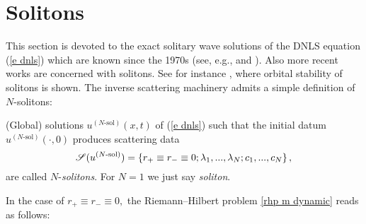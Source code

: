 \section{Solitons}\label{s solitons}
This section is devoted to the exact solitary wave solutions of the DNLS equation (\ref{e dnls}) which are known since the 1970s (see, e.g., \cite{mjlhus1976} and \cite{KaupNewell1978}). Also more recent works are concerned with solitons. See for instance \cite{Colin2006}, where orbital stability of solitons is shown. The inverse scattering machinery admits a simple definition of $N$-solitons:
\begin{defn}
    (Global) solutions $u^{(N\text{-sol})}(x,t)$ of (\ref{e dnls}) such that the initial datum $u^{(N\text{-sol})}(\cdot,0)$ produces scattering data
    \begin{equation*}
        \mathcal{S} (u^{(N\text{-sol})})=\left\{r_+\equiv r_-\equiv 0;\lambda_1,... ,\lambda_N;c_1,...,c_N\right\},
    \end{equation*}
    are called $N$-\emph{solitons}. For $N=1$ we just say \emph{soliton}.
\end{defn}
In the case of $r_+\equiv r_-\equiv 0,$ the Riemann--Hilbert problem \rh \ref{rhp m dynamic} reads as follows:
